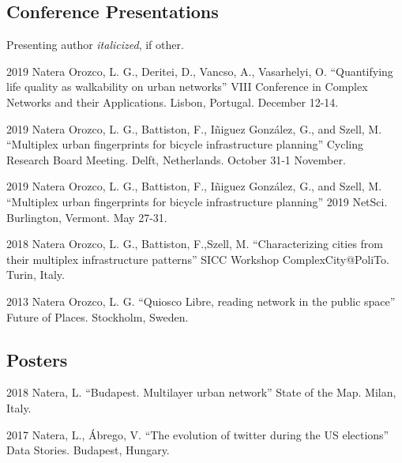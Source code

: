 \documentclass{academiccv}
\begin{document}



\subsection*{Conference Presentations}

Presenting author \textit{italicized}, if other.\bigskip

\begin{tablist}
\item[2019] \tab Natera Orozco, L. G., Deritei, D., Vancso, A., Vasarhelyi, O. \enquote{Quantifying life quality as walkability on urban networks} VIII Conference in Complex Networks and their Applications. Lisbon, Portugal. December 12-14.

\item[2019] \tab Natera Orozco, L. G., Battiston, F., Iñiguez González, G., and Szell, M. \enquote{Multiplex urban fingerprints for bicycle infrastructure planning} Cycling Research Board Meeting. Delft, Netherlands. October 31-1 November.

\item[2019] \tab Natera Orozco, L. G., Battiston, F., Iñiguez González, G., and Szell, M. \enquote{Multiplex urban fingerprints for bicycle infrastructure planning} 2019 NetSci. Burlington, Vermont. May 27-31.

\item[2018] \tab Natera Orozco, L. G., Battiston, F.,Szell, M. \enquote{Characterizing cities from their multiplex infrastructure patterns} SICC Workshop ComplexCity@PoliTo. Turin, Italy.

\item[2013] \tab Natera Orozco, L. G. \enquote{Quiosco Libre, reading network in the public space} Future of Places. Stockholm, Sweden.
\end{tablist}

\subsection*{Posters}

\begin{tablist}
	\item[2018] \tab Natera, L. \enquote{Budapest. Multilayer urban network} State of the Map. Milan, Italy.
	\item[2017] \tab Natera, L., Ábrego, V. \enquote{The evolution of twitter during the US elections} Data Stories. Budapest, Hungary.
\end{tablist}
\end{document}
